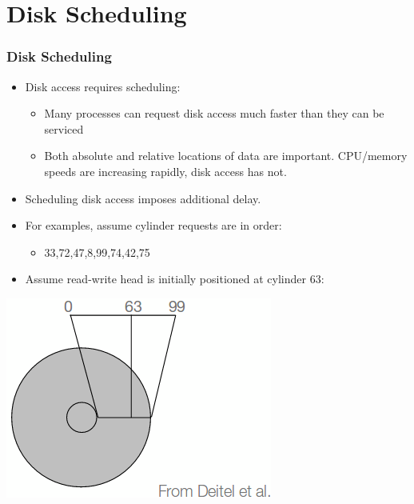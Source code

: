 \documentclass{beamer}
\begin{document}
\section{Disk Scheduling}
\begin{frame}
\frametitle{Disk Scheduling}
\begin{itemize}
\item Disk access requires scheduling:
\begin{itemize}
\item Many processes can request disk access much faster than they can be serviced
\item Both absolute and relative locations of data are important. CPU/memory speeds are increasing rapidly, disk access has not.
\end{itemize}
\item Scheduling disk access imposes additional delay.
\item For examples, assume cylinder requests are in order:
\begin{itemize}
\item 33,72,47,8,99,74,42,75
\end{itemize}
\item Assume read-write head is initially positioned at cylinder 63:

\end{itemize}
\includegraphics[scale=0.35]{cyl.png}
\end{frame}

\end{document}
